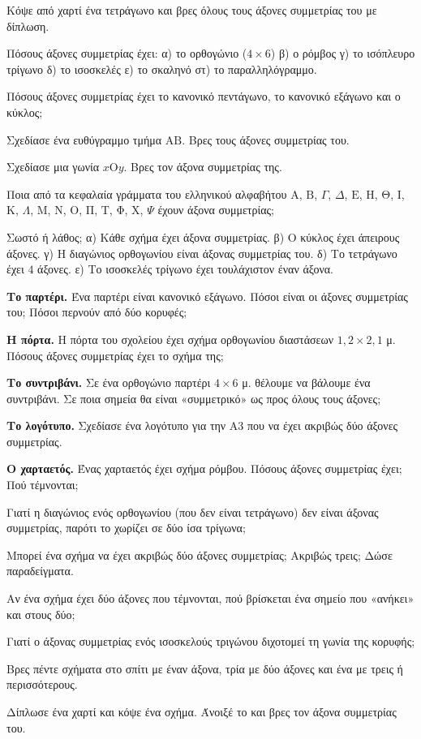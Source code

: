 \ex Κόψε από χαρτί ένα τετράγωνο και βρες όλους τους άξονες συμμετρίας του με δίπλωση.

\ex Πόσους άξονες συμμετρίας έχει: α) το ορθογώνιο ($4\times6$) \quad β) ο ρόμβος \quad γ) το ισόπλευρο τρίγωνο \quad δ) το ισοσκελές \quad ε) το σκαληνό \quad στ) το παραλληλόγραμμο.

\ex Πόσους άξονες συμμετρίας έχει το κανονικό πεντάγωνο, το κανονικό εξάγωνο και ο κύκλος;

\ex Σχεδίασε ένα ευθύγραμμο τμήμα $\mathrm{ΑΒ}$. Βρες τους άξονες συμμετρίας του.

\ex Σχεδίασε μια γωνία $x\mathrm{Ο}y$. Βρες τον άξονα συμμετρίας της.

\ex Ποια από τα κεφαλαία γράμματα του ελληνικού αλφαβήτου $\mathrm{Α}$, $\mathrm{Β}$, $\Gamma$, $\Delta$, $\mathrm{Ε}$, $\mathrm{Η}$, $\mathrm{Θ}$, $\mathrm{Ι}$, $\mathrm{Κ}$, $\Lambda$, $\mathrm{Μ}$, $\mathrm{Ν}$, $\mathrm{Ο}$, $\mathrm{Π}$, $\mathrm{Τ}$, $\mathrm{Φ}$, $\mathrm{Χ}$, $\Psi$ έχουν άξονα συμμετρίας;

\ex Σωστό ή λάθος; α) Κάθε σχήμα έχει άξονα συμμετρίας. \quad β) Ο κύκλος έχει άπειρους άξονες. \quad γ) Η διαγώνιος ορθογωνίου είναι άξονας συμμετρίας του. \quad δ) Το τετράγωνο έχει $4$ άξονες. \quad ε) Το ισοσκελές τρίγωνο έχει τουλάχιστον έναν άξονα.


\ex \textbf{Το παρτέρι.} Ένα παρτέρι είναι κανονικό εξάγωνο. Πόσοι είναι οι άξονες συμμετρίας του; Πόσοι περνούν από δύο κορυφές;

\ex \textbf{Η πόρτα.} Η πόρτα του σχολείου έχει σχήμα ορθογωνίου διαστάσεων $1{,}2\times2{,}1$ μ. Πόσους άξονες συμμετρίας έχει το σχήμα της;

\ex \textbf{Το συντριβάνι.} Σε ένα ορθογώνιο παρτέρι $4\times6$ μ. θέλουμε να βάλουμε ένα συντριβάνι. Σε ποια σημεία θα είναι «συμμετρικό» ως προς όλους τους άξονες;

\ex \textbf{Το λογότυπο.} Σχεδίασε ένα λογότυπο για την Α3 που να έχει ακριβώς δύο άξονες συμμετρίας.

\ex \textbf{Ο χαρταετός.} Ένας χαρταετός έχει σχήμα ρόμβου. Πόσους άξονες συμμετρίας έχει; Πού τέμνονται;


\ex Γιατί η διαγώνιος ενός ορθογωνίου (που δεν είναι τετράγωνο) δεν είναι άξονας συμμετρίας, παρότι το χωρίζει σε δύο ίσα τρίγωνα;

\ex Μπορεί ένα σχήμα να έχει ακριβώς δύο άξονες συμμετρίας; Ακριβώς τρεις; Δώσε παραδείγματα.

\ex Αν ένα σχήμα έχει δύο άξονες που τέμνονται, πού βρίσκεται ένα σημείο που «ανήκει» και στους δύο;

\ex Γιατί ο άξονας συμμετρίας ενός ισοσκελούς τριγώνου διχοτομεί τη γωνία της κορυφής;


\ex Βρες πέντε σχήματα στο σπίτι με έναν άξονα, τρία με δύο άξονες και ένα με τρεις ή περισσότερους.

\ex Δίπλωσε ένα χαρτί και κόψε ένα σχήμα. Άνοιξέ το και βρες τον άξονα συμμετρίας του.
